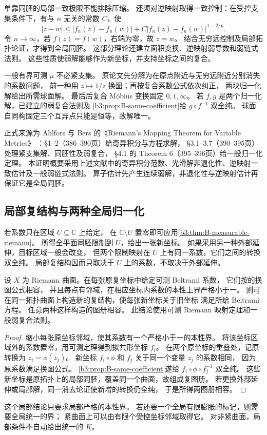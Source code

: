 \begin{proofsketch}
单靠同胚的局部一致极限不能排除压缩。
还须对逆映射取得一致控制：在受控支集条件下，有与 \(n\) 无关的常数 \(C\)，使
\[
 |z-w|\le |f_n(z)-f_n(w)|
       +C|f_n(z)-f_n(w)|^{1-2/p}.
\]
令 \(n\to\infty\)，若 \(f(z)=f(w)\)，右端为零，故 \(z=w\)。
结合无穷远控制及局部拓扑论证，才得到全局同胚。
这部分理论还建立面积变换、逆映射弱导数和弱链式法则。
这些性质使弱解能够作为新坐标，并支持坐标之间的复合。

一般有界可测 \(\mu\) 不必紧支集。
原论文先分解为在原点附近与无穷远附近分别消失的系数问题，
前一种用 \(z\mapsto1/z\) 换图；再按复合系数公式依次纠正，
两块归一化解给出所需球面解。
最后后复合 Möbius 变换固定 \(0,1,\infty\)。
若 \(f,g\) 是两个归一化解，已建立的弱复合法则及
\cref{b3:prop:B-same-coefficient}给 \(g\circ f^{-1}\) 双全纯。
球面自同构固定三个互异点只能是恒等，故解唯一。

正式来源为 Ahlfors 与 Bers 的《Riemann's Mapping Theorem for Variable Metrics》%
\cite{AhlforsBers1960VariableMetrics}：§1--2（386--390页）给奇异积分与方程求解，
§3.1--3.7（390--395页）处理紧支集解、同胚性及弱复合，
§4.1 的 Theorem 6（395--396页）给一般归一化定理。
本证明概要采用上述文献中的奇异积分范数、光滑解非退化性、逆映射一致估计及一般弱链式法则。
算子估计先产生连续弱解，非退化性与逆映射估计再保证它是全局同胚。
\end{proofsketch}

\subsection{局部复结构与两种全局归一化}
\label{b3:subsec:B0403}

若系数只在区域 \(U\subseteq\mathbb C\) 上给定，
在 \(\mathbb C\setminus U\) 置零即可应用\cref{b3:thm:B-measurable-riemann}。
所得全平面同胚限制到 \(U\)，给出一张新坐标。
如果采用另一种外部延伸，目标区域一般会改变，
但两个限制映射在 \(U\) 上有同一系数，它们之间的转换双全纯。
局部复结构因而只取决于 \(U\) 上的系数，不取决于外部延伸。

\begin{proposition}[相容系数的局部积分]\label{b3:prop:B-local-structure}
设 \(X\) 为 Riemann 曲面。在每张原复坐标中给定可测 Beltrami 系数，
它们按的换图公式相容，
并且每点有邻域，在相应坐标内系数的本性上界严格小于一。
则可在同一拓扑曲面上构造新的复结构，使每张新坐标关于旧坐标
满足所给 Beltrami 方程。
任意两种这样构造的图册相容。
此结论使用可测 Riemann 映射定理和一般弱复合法则。
\end{proposition}
\begin{proof}
缩小每张原坐标邻域，使其系数有一个严格小于一的本性界。
将该坐标区域外的系数置零，用可测定理得到拟共形坐标 \(f_i\)。
在两个原坐标的重叠处，记原转换为 \(z_i=\phi(z_j)\)。
新坐标 \(f_i\circ\phi\) 和 \(f_j\) 关于同一个变量 \(z_j\) 的系数相同，
因为原系数满足换图公式。
\cref{b3:prop:B-same-coefficient}遂给
\(f_i\circ\phi\circ f_j^{-1}\) 双全纯。
这些新坐标是原拓扑上的局部同胚，覆盖同一个曲面，故组成复图册。
若更换外部延伸或局部解，同一消去论证使新增的转换仍全纯，
于是所得两图册相容。
\end{proof}
这个局部结论只要求局部严格的本性界。
若还要一个全局有限膨胀的标记，则需要全局统一的界；
紧曲面上可以由有限个受控坐标邻域取得它。
对非紧曲面，局部条件不自动给出统一的 \(K\)。

